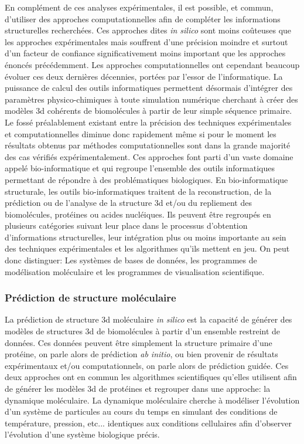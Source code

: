 En complément de ces analyses expérimentales, il est possible, et commun, d'utiliser des approches computationnelles afin de compléter les informations structurelles recherchées. Ces approches dites \textit{in silico} sont moins coûteuses que les approches expérimentales mais souffrent d'une précision moindre et surtout d'un facteur de confiance significativement moins important que les approches énoncés précédemment. Les approches computationnelles ont cependant beaucoup évoluer ces deux dernières décennies, portées par l'essor de l'informatique. La puissance de calcul des outils informatiques permettent désormais d'intégrer des paramètres physico-chimiques à toute simulation numérique cherchant à créer des modèles 3d cohérents de biomolécules à partir de leur simple séquence primaire. Le fossé préalablement existant entre la précision des techniques expérimentales et computationnelles diminue donc rapidement même si pour le moment les résultats obtenus par méthodes computationnelles sont dans la grande majorité des cas vérifiés expérimentalement. Ces approches font parti d'un vaste domaine appelé bio-informatique et qui regroupe l'ensemble des outils informatiques permettant de répondre à des problématiques biologiques. En bio-informatique structurale, les outils bio-informatiques traitent de la reconstruction, de la prédiction ou de l'analyse de la structure 3d et/ou du repliement des biomolécules, protéines ou acides nucléiques. Ils peuvent être regroupés en plusieurs catégories suivant leur place dans le processus d'obtention d'informations structurelles, leur intégration plus ou moins importante au sein des techniques expérimentales et les algorithmes qu'ils mettent en jeu. On peut donc distinguer: Les systèmes de bases de données, les programmes de modélisation moléculaire et les programmes de visualisation scientifique.

\subsubsection{Prédiction de structure moléculaire}

La prédiction de structure 3d moléculaire \textit{in silico} est la capacité de générer des modèles de structures 3d de biomolécules à partir d'un ensemble restreint de données. Ces données peuvent être simplement la structure primaire d'une protéine, on parle alors de prédiction \textit{ab initio}, ou bien provenir de résultats expérimentaux et/ou computationnels, on parle alors de prédiction guidée. Ces deux approches ont en commun les algorithmes scientifiques qu'elles utilisent afin de générer les modèles 3d de protéines et regrouper dans une approche: la dynamique moléculaire. La dynamique moléculaire cherche à modéliser l'évolution d'un système de particules au cours du temps en simulant des conditions de température, pression, etc... identiques aux conditions cellulaires afin d'observer l'évolution d'une système biologique précis.

